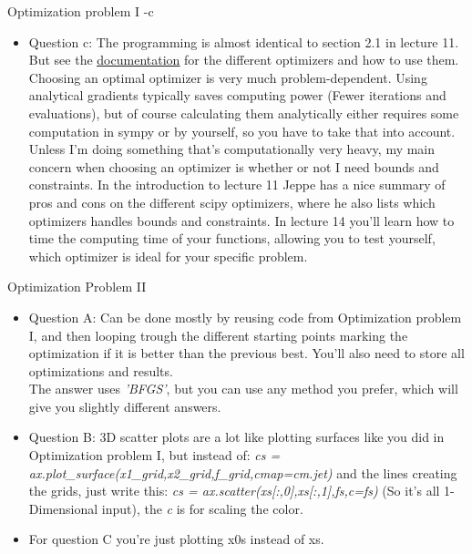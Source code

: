 \documentclass[10pt,danish,t,10pt]{beamer}
\newcommand{\code}[1]{\textit{#1}} %
\begin{document}
\begin{frame}{Optimization problem I -c}
    \begin{itemize}
        \item Question c: The programming is almost identical to section 2.1 in lecture 11. But see the \href{https://docs.scipy.org/doc/scipy/reference/generated/scipy.optimize.minimize.html\#scipy.optimize.minimize}{\underline{documentation}} for the different optimizers and how to use them. \newline
            Choosing an optimal optimizer is very much problem-dependent. Using analytical gradients typically saves computing power (Fewer iterations and evaluations), but of course calculating them analytically either requires some computation in sympy or by yourself, so you have to take that into account. Unless I'm doing something that's computationally very heavy, my main concern when choosing an optimizer is whether or not I need bounds and constraints. In the introduction to lecture 11 Jeppe has a nice summary of pros and cons on the different scipy optimizers, where he also lists which optimizers handles bounds and constraints. \newline
            In lecture 14 you'll learn how to time the computing time of your functions, allowing you to test yourself, which optimizer is ideal for your specific problem. 
    \end{itemize}
\end{frame}

\begin{frame}{Optimization Problem II}
    \begin{itemize}
        \item Question A: Can be done mostly by reusing code from Optimization problem I, and then looping trough the different starting points marking the optimization if it is better than the previous best. You'll also need to store all optimizations and results. \\
        The answer uses \code{'BFGS'}, but you can use any method you prefer, which will give you slightly different answers.
        \item Question B: 3D scatter plots are a lot like plotting surfaces like you did in Optimization problem I, but instead of: \newline
        \code{cs = ax.plot\_surface(x1\_grid,x2\_grid,f\_grid,cmap=cm.jet)} \newline 
        and the lines creating the   grids, just write this: \newline 
        \code{cs = ax.scatter(xs[:,0],xs[:,1],fs,c=fs)} \newline
        (So it's all 1-Dimensional input), the \code{c} is for scaling the color.
        \item For question C you're just plotting x0s instead of xs.
    \end{itemize}
\end{frame}
\end{document}
